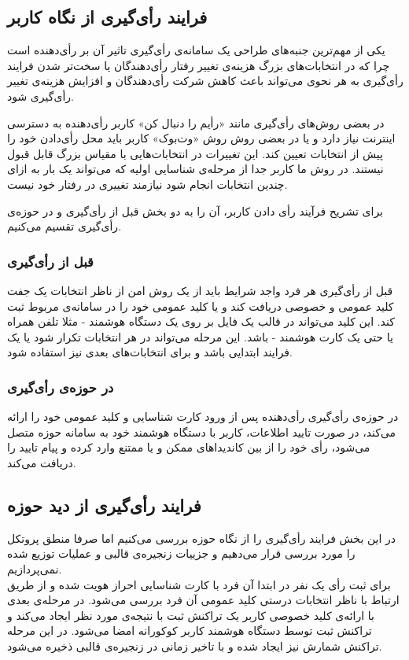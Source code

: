 \subsection{فرایند رأی‌گیری از نگاه کاربر}
یکی از مهم‌ترین جنبه‌های طراحی یک سامانه‌ی رأی‌گیری تاثیر آن بر رأی‌دهنده است چرا که در انتخابات‌های بزرگ هزینه‌ی تغییر رفتار رأی‌دهندگان یا سخت‌تر شدن فرایند رأی‌گیری به هر نحوی می‌تواند باعث کاهش شرکت رأی‌دهندگان و افزایش هزینه‌ی تغییر رأی‌گیری شود.
\par
در بعضی روش‌های رأی‌گیری مانند «رأیم را دنبال کن»
 کاربر رأی‌دهنده به دسترسی اینترنت نیاز دارد و یا در بعضی روش‌ روش «وت‌بوک»
  کاربر باید محل رأی‌دادن خود را پیش از انتخابات تعیین کند. این تغییرات در انتخابات‌هایی با مقیاس بزرگ قابل قبول نیستند. در روش ما کاربر جدا از مرحله‌ی شناسایی اولیه که می‌تواند یک بار به ازای چندین انتخابات انجام شود نیازمند تغییری در رفتار خود نیست. 
\par
برای تشریح فرآیند رأی‌ دادن کاربر، آن را به دو بخش قبل از رأی‌گیری و در حوزه‌ی رأی‌گیری تقسیم می‌کنیم. 
\subsubsection{قبل از رأی‌گیری}
قبل از رأی‌گیری هر فرد واجد شرایط باید از یک روش امن از ناظر انتخابات یک جفت کلید عمومی و خصوصی دریافت کند و یا کلید عمومی خود را در سامانه‌ی مربوط ثبت کند. این کلید می‌تواند در قالب یک فایل بر روی یک دستگاه هوشمند - مثلا تلفن همراه یا حتی یک کارت هوشمند - باشد. این مرحله  می‌تواند در هر انتخابات تکرار شود یا یک فرایند ابتدایی باشد و برای انتخابات‌های بعدی نیز استفاده شود. 
\subsubsection{در حوزه‌ی رأی‌گیری}
در حوزه‌ی رأی‌گیری رأی‌دهنده پس از ورود کارت شناسایی و کلید عمومی خود را ارائه می‌کند، در صورت تایید اطلاعات، کاربر با دستگاه هوشمند خود به سامانه‌ حوزه متصل می‌شود، رأی‌ خود را از بین‌ کاندیدا‌های ممکن و یا ممتنع وارد کرده و پیام تایید را دریافت می‌کند. 
\subsection{فرایند رأی‌گیری از دید حوزه‌}
در این بخش فرایند رأی‌گیری را از نگاه حوزه‌ بررسی می‌کنیم اما صرفا منطق پروتکل را مورد بررسی قرار می‌دهیم و جزییات زنجیره‌ی قالبی و عملیات توزیع شده نمی‌پردازیم. 
\\
برای ثبت رأی یک‌ نفر در ابتدا آن فرد با کارت شناسایی احراز هویت شده و از طریق ارتباط با ناظر انتخابات درستی کلید عمومی آن فرد بررسی می‌شود. در مرحله‌ی بعدی با ارائه‌ی کلید خصوصی کاربر یک تراکنش ثبت با نتیجه‌ی مورد نظر ایجاد می‌کند و تراکنش ثبت توسط دستگاه هوشمند کاربر کوکورانه امضا می‌شود. در این مرحله تراکنش شمارش نیز ایجاد شده و با تاخیر زمانی در زنجیره‌ی قالبی ذخیره می‌شود.

